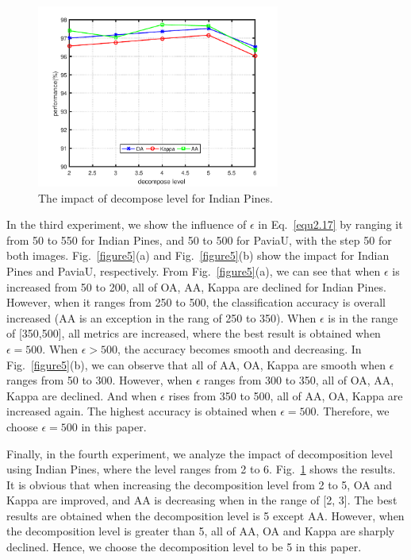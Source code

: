 \documentclass{ws-ijwmip}
\begin{document}
  \begin{figure}[htb]
\centerline{\includegraphics[width=8cm]{image/decomposeLevel}}
\vspace*{8pt}
\caption{The impact of decompose level for Indian Pines.}
\label{figure6}
\end{figure}





In the third experiment, we show the influence of $\epsilon$ in Eq.~\ref{equ2.17} by ranging it from 50 to 550 for Indian Pines, and 50 to 500 for PaviaU, with the step 50 for both images. Fig.~\ref{figure5}(a) and Fig.~\ref{figure5}(b) show the  impact for Indian Pines and PaviaU, respectively. From Fig.~\ref{figure5}(a), we can see that when $\epsilon$ is increased from 50 to 200, all of OA, AA, Kappa are declined for Indian Pines.
However, when it ranges from 250 to 500, the classification accuracy is overall increased (AA is an exception in the rang of 250 to 350). 
When $\epsilon$ is in the range of [350,500], all  metrics are increased, where the best result is obtained when $\epsilon = 500$.
When $\epsilon>500$, the accuracy becomes smooth and decreasing. In Fig.~\ref{figure5}(b), we can observe that all of AA, OA, Kappa are smooth when $\epsilon$ ranges from 50 to 300.
However, when $\epsilon$ ranges from 300 to 350, all of OA, AA, Kappa are declined. 
And when $\epsilon$ rises from 350 to 500, all of AA, OA, Kappa are increased again.
The highest accuracy is obtained when $\epsilon =500$. Therefore, we choose $\epsilon=500$  in this paper.





Finally, in the fourth experiment, we analyze the impact of decomposition level using Indian Pines, where the level ranges from 2 to 6. 
Fig.~\ref{figure6} shows the results. It is obvious that when increasing the decomposition level from 2 to 5, OA and Kappa are improved, and AA is decreasing when in the range of [2, 3]. 
The best results are obtained when the decomposition level is 5 except AA. However, when the decomposition level is greater than 5, all of AA, OA and Kappa are sharply declined. Hence, we choose the decomposition level to be 5 in this paper.
\end{document}
